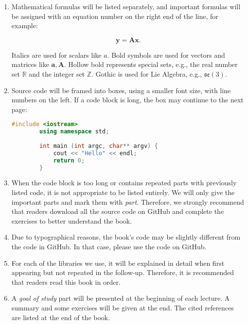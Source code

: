 \begin{English}
    \begin{enumerate}
    	\item Mathematical formulas will be listed separately, and important formulas will be assigned with an equation number on the right end of the line, for example:
    
    	\begin{equation}
    	\mathbf{y} =\mathbf{A}\mathbf{x}.
    	\end{equation}
    
    	Italics are used for scalars like $a$. Bold symbols are used for vectors and matrices like $\mathbf{a}, \mathbf{A}$. Hollow bold represents special sets, e.g., the real number set $\mathbb{R}$ and the integer set $\mathbb{Z}$. Gothic is used for Lie Algebra, e.g., $\mathfrak{se}(3)$.
    
    	\item Source code will be framed into boxes, using a smaller font size, with line numbers on the left. If a code block is long, the box may continue to the next page:
    	\begin{lstlisting}[language=C++,caption=Code example:]
    	#include <iostream>
    	using namespace std;
    
    	int main (int argc, char** argv) {
    		cout << "Hello" << endl;
    		return 0;
    	}
    	\end{lstlisting}
    
    	\item When the code block is too long or contains repeated parts with previously listed code, it is not appropriate to be listed entirely. We will only give the important parts and mark them with \textit{part}. Therefore, we strongly recommend that readers download all the source code on GitHub and complete the exercises to better understand the book.
    
    	\item Due to typographical reasons, the book's code may be slightly different from the code in GitHub. In that case, please use the code on GitHub.
    
    	\item For each of the libraries we use, it will be explained in detail when first appearing but not repeated in the follow-up. Therefore, it is recommended that readers read this book in order.
    
    	\item A \textit{goal of study} part will be presented at the beginning of each lecture. A summary and some exercises will be given at the end. The cited references are listed at the end of the book.
    

\end{enumerate}
\end{English}
